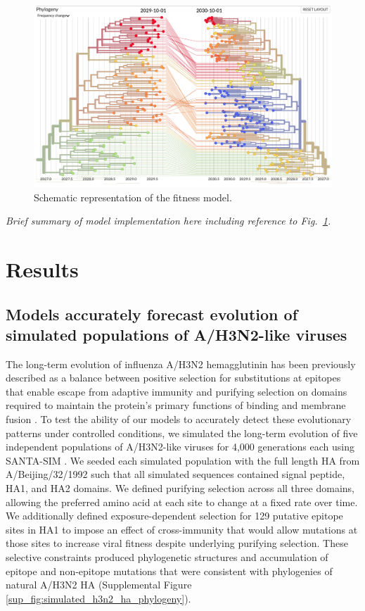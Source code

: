 \begin{figure}[t]
  \begin{center}
  \includegraphics[width=\textwidth]{figures/model.png}
  \caption{Schematic representation of the fitness model.}
  \label{fig:model}
  \end{center}
\end{figure}

\textit{Brief summary of model implementation here including reference to Fig.~\ref{fig:model}.}

\section*{Results}

\subsection*{Models accurately forecast evolution of simulated populations of {A/H3N2-like viruses}}

The long-term evolution of influenza A/H3N2 hemagglutinin has been previously described as a balance between positive selection for substitutions at epitopes that enable escape from adaptive immunity and purifying selection on domains required to maintain the protein's primary functions of binding and membrane fusion \cite{Bush:1999vj,Neher2013,Luksza:2014hj,Koelle:2015dh}.
To test the ability of our models to accurately detect these evolutionary patterns under controlled conditions, we simulated the long-term evolution of five independent populations of A/H3N2-like viruses for 4,000 generations each using SANTA-SIM \cite{Jariani2019}.
We seeded each simulated population with the full length HA from A/Beijing/32/1992 such that all simulated sequences contained signal peptide, HA1, and HA2 domains.
We defined purifying selection across all three domains, allowing the preferred amino acid at each site to change at a fixed rate over time.
We additionally defined exposure-dependent selection for 129 putative epitope sites in HA1 \cite{Wolf:2006da} to impose an effect of cross-immunity that would allow mutations at those sites to increase viral fitness despite underlying purifying selection.
These selective constraints produced phylogenetic structures and accumulation of epitope and non-epitope mutations that were consistent with phylogenies of natural A/H3N2 HA (Supplemental Figure \ref{sup_fig:simulated_h3n2_ha_phylogeny}).


